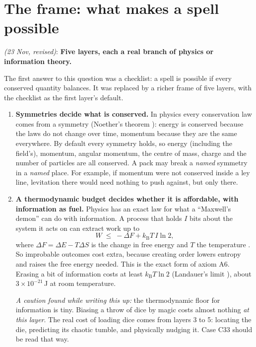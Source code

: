 \documentclass[11pt,a4paper]{article}
\newcommand{\decision}[3]{\par\smallskip\noindent{\color{dec}\textbf{Decision #1}} \textit{(#2)}: \textbf{#3}\par}
\newcommand{\case}[1]{\textsf{#1}}
\newcommand{\kB}{k_{\mathrm B}}
\begin{document}
\section{The frame: what makes a spell possible}\label{sec:frame}

\decision{Q0}{23 Nov, revised}{Five layers, each a real branch of physics or information theory.}

The first answer to this question was a checklist: a spell is possible if every conserved quantity balances. It was replaced by a richer frame of five layers, with the checklist as the first layer's default.

\begin{enumerate}
  \item \textbf{Symmetries decide what is conserved.} In physics every conservation law comes from a symmetry (Noether's theorem \cite{noether}): energy is conserved because the laws do not change over time, momentum because they are the same everywhere. By default every symmetry holds, so energy (including the field's), momentum, angular momentum, the centre of mass, charge and the number of particles are all conserved. A pack may break a \emph{named} symmetry in a \emph{named} place. For example, if momentum were not conserved inside a ley line, levitation there would need nothing to push against, but only there.

  \item \textbf{A thermodynamic budget decides whether it is affordable, with information as fuel.} Physics has an exact law for what a ``Maxwell's demon'' can do with information. A process that holds $I$ bits about the system it acts on can extract work up to
  \begin{equation}
    W \;\le\; -\Delta F + \kB T\, I \ln 2,
  \end{equation}
  where $\Delta F = \Delta E - T\Delta S$ is the change in free energy and $T$ the temperature \cite{sagawa}. So improbable outcomes cost extra, because creating order lowers entropy and raises the free energy needed. This is the exact form of axiom A6. Erasing a bit of information costs at least $\kB T \ln 2$ (Landauer's limit \cite{landauer}), about $3\times10^{-21}$\,J at room temperature.

  \textit{A caution found while writing this up:} the thermodynamic floor for information is tiny. Biasing a throw of dice by magic costs almost nothing \emph{at this layer}. The real cost of loading dice comes from layers 3 to 5: locating the die, predicting its chaotic tumble, and physically nudging it. Case \case{C33} should be read that way.


\end{enumerate}
\end{document}
